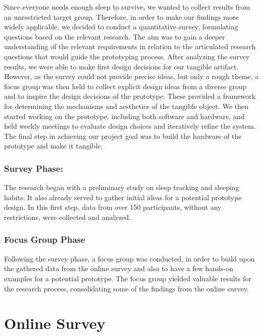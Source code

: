 \documentclass[
  a4paper,  %
  twoside,  %
  bibliography=totoc,
  headsepline,
  cleardoublepage=empty,
  parskip=half,
  draft=false
]{scrbook}
\begin{document}
Since everyone needs enough sleep to survive, we wanted to collect results from an unrestricted target group. Therefore, in order to make our findings more widely applicable, we decided to conduct a quantitative survey, formulating questions based on the relevant research. The aim was to gain a deeper understanding of the relevant requirements in relation to the articulated research questions that would guide the prototyping process. After analyzing the survey results, we were able to make first design decisions for our tangible artifact. However, as the survey could not provide precise ideas, but only a rough theme, a focus group was then held to collect explicit design ideas from a diverse group and to inspire the design decisions of the prototype. These provided a framework for determining the mechanisms and aesthetics of the tangible object. We then started working on the prototype, including both software and hardware, and held weekly meetings to evaluate design choices and iteratively refine the system. The final step in achieving our project goal was to build the hardware of the prototype and make it tangible.

\subsection{Survey Phase:} 
The research began with a preliminary study on sleep tracking and sleeping habits. It also already served to gather initial ideas for a potential prototype design. In this first step, data from over 150 participants, without any restrictions, were collected and analyzed.

\subsection{Focus Group Phase}
Following the survey phase, a focus group was conducted, in order to build upon the gathered data from the online survey and also to have a few hands-on examples for a potential prototype. The focus group yielded valuable results for the research process, consolidating some of the findings from the online survey.



\chapter{Online Survey}
\end{document}
